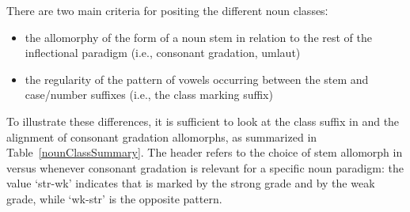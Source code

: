 There are two main criteria for positing the different noun classesː
\begin{itemize}
\item{the allomorphy of the  form of a noun stem in relation to the rest of the inflectional paradigm (i.e., consonant gradation, umlaut)}
\item{the regularity of the pattern of vowels occurring between the stem and case/number suffixes (i.e., the class marking suffix)}
\end{itemize} 
To illustrate these differences, it is sufficient to look at the class suffix in  and the alignment of consonant gradation allomorphs, as summarized in  
Table~\vref{nounClassSummary}. %
The header  refers to the choice of stem allomorph in  versus  whenever consonant gradation is relevant for a specific noun paradigm: the value ‘str-wk’ indicates that  is marked by the strong grade and  by the weak grade, while ‘wk-str’ is the opposite pattern. %
